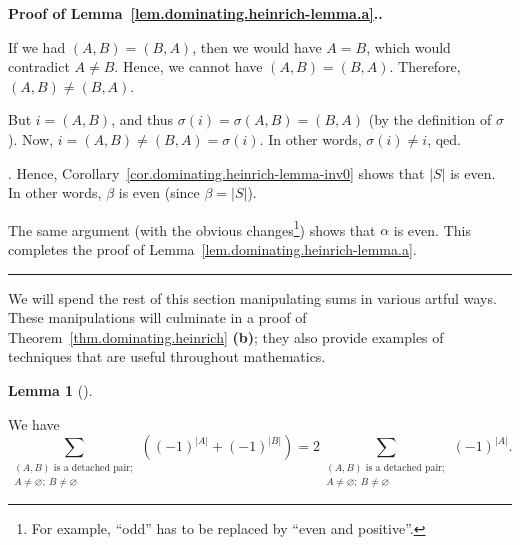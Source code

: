 \documentclass[numbers=enddot,12pt,final,onecolumn,notitlepage]{scrartcl}%
\theoremstyle{definition}
\newtheorem{lem}[theo]{Lemma}
\newenvironment{lemma}[1][]
{\begin{lem}[#1]\begin{leftbar}}
{\end{leftbar}\end{lem}}
\newenvironment{proof}[1][Proof]{\noindent\textbf{#1.} }{\ \rule{0.5em}{0.5em}}
\let\sumnonlimits\sum
\renewcommand{\sum}{\sumnonlimits\limits}
\newcommand{\abs}[1]{\left| #1 \right|}
\newcommand{\tup}[1]{\left( #1 \right)}
\begin{document}
\begin{proof}[Proof of Lemma~\ref{lem.dominating.heinrich-lemma.a}.]
{If we had $\tup{A, B} = \tup{B, A}$, then we would have
$A = B$, which would contradict $A \neq B$. Hence, we cannot have
$\tup{A, B} = \tup{B, A}$. Therefore, $\tup{A, B} \neq
\tup{B, A}$.

But $i = \tup{A, B}$, and thus $\sigma\tup{i} = \sigma\tup{A, B}
= \tup{B, A}$ (by the definition of $\sigma$).
Now, $i = \tup{A, B} \neq \tup{B, A} = \sigma\tup{i}$. In other
words, $\sigma\tup{i} \neq i$, qed.}.
Hence, Corollary~\ref{cor.dominating.heinrich-lemma-inv0}
shows that $\abs{S}$ is even. In other words, $\beta$ is even
(since $\beta = \abs{S}$).

The same argument (with the obvious changes\footnote{For example,
``odd'' has to be replaced by ``even and positive''.}) shows that
$\alpha$ is even. This completes the proof of
Lemma~\ref{lem.dominating.heinrich-lemma.a}.
\end{proof}

We will spend the rest of this section manipulating sums in various
artful ways. These manipulations will culminate in a proof
of Theorem~\ref{thm.dominating.heinrich} \textbf{(b)}; they also
provide examples of techniques that are useful throughout
mathematics.

\begin{lemma} \label{lem.dominating.heinrich-lemma-2sum}
We have
\[
\sum_{\substack{\tup{A, B} \text{ is a detached pair}; \\
                A \neq \varnothing; \  B \neq \varnothing}}
  \tup{\tup{-1}^{\abs{A}} + \tup{-1}^{\abs{B}}}
= 2
\sum_{\substack{\tup{A, B} \text{ is a detached pair}; \\
                A \neq \varnothing; \  B \neq \varnothing}}
  \tup{-1}^{\abs{A}} .
\]
\end{lemma}
\end{document}
